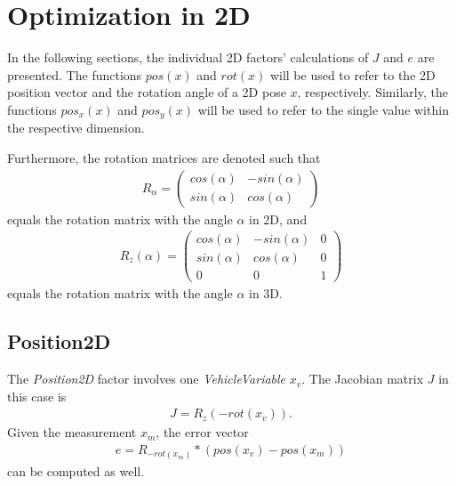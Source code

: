\section{Optimization in 2D}
\label{optimization_2d}
In the following sections, the individual 2D factors' calculations of $J$ and $e$ are presented. The functions $pos(x)$ and $rot(x)$ will be used to refer to the 2D position vector and the rotation angle of a 2D pose $x$, respectively. Similarly, the functions $pos_x(x)$ and $pos_y(x)$ will be used to refer to the single value within the respective dimension.

Furthermore, the rotation matrices are denoted such that
\begin{align}
	R_\alpha =
	\begin{pmatrix}
		cos(\alpha) & -sin(\alpha)\\
		sin(\alpha) &  cos(\alpha)
	\end{pmatrix}
\end{align}
equals the rotation matrix with the angle $\alpha$ in 2D, and
\begin{align}
	R_z(\alpha) =
	\begin{pmatrix}
		cos(\alpha) & -sin(\alpha) & 0\\
		sin(\alpha) &  cos(\alpha) & 0\\
		          0 &            0 & 1
	\end{pmatrix}
\end{align}
equals the rotation matrix with the angle $\alpha$ in 3D.



\subsection{Position2D}
The \textit{Position2D} factor involves one \textit{VehicleVariable} $x_v$. The Jacobian matrix $J$ in this case is
\begin{align}
	J = R_z(-rot(x_v)).
\end{align}
Given the measurement $x_m$, the error vector
\begin{align}
	e = R_{-rot(x_m)} * (pos(x_v) - pos(x_m))
\end{align}
can be computed as well.



